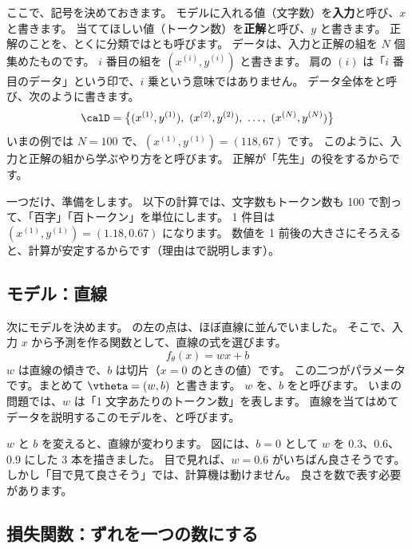 ここで、記号を決めておきます。
モデルに入れる値（文字数）を\textbf{入力}と呼び、$x$ と書きます。
当ててほしい値（トークン数）を\textbf{正解}と呼び、$y$ と書きます。
正解のことを、とくに分類ではとも呼びます。
データは、入力と正解の組を $N$ 個集めたものです。
$i$ 番目の組を $(x^{(i)}, y^{(i)})$ と書きます。
肩の $(i)$ は「$i$ 番目のデータ」という印で、$i$ 乗という意味ではありません。
データ全体をと呼び、次のように書きます。
\begin{equation}
\calD = \bigl\{(x^{(1)}, y^{(1)}),\ (x^{(2)}, y^{(2)}),\ \dots,\ (x^{(N)}, y^{(N)})\bigr\}
\end{equation}
いまの例では $N=100$ で、$(x^{(1)}, y^{(1)}) = (118, 67)$ です。
このように、入力と正解の組から学ぶやり方をと呼びます。
正解が「先生」の役をするからです。

一つだけ、準備をします。
以下の計算では、文字数もトークン数も 100 で割って、「百字」「百トークン」を単位にします。
1 件目は $(x^{(1)}, y^{(1)}) = (1.18, 0.67)$ になります。
数値を 1 前後の大きさにそろえると、計算が安定するからです（理由はで説明します）。

\subsection*{モデル：直線}

次にモデルを決めます。
の左の点は、ほぼ直線に並んでいました。
そこで、入力 $x$ から予測を作る関数として、直線の式を選びます。
\begin{equation}
f_\theta(x) = wx + b
\label{eq:ml-linear-model}
\end{equation}
$w$ は直線の傾きで、$b$ は切片（$x=0$ のときの値）です。
この二つがパラメータです。まとめて $\vtheta = (w, b)$ と書きます。
$w$ を、$b$ をと呼びます。
いまの問題では、$w$ は「1 文字あたりのトークン数」を表します。
直線を当てはめてデータを説明するこのモデルを、と呼びます。

$w$ と $b$ を変えると、直線が変わります。
図には、$b=0$ として $w$ を 0.3、0.6、0.9 にした 3 本を描きました。
目で見れば、$w=0.6$ がいちばん良さそうです。
しかし「目で見て良さそう」では、計算機は動けません。
良さを数で表す必要があります。

\subsection*{損失関数：ずれを一つの数にする}

